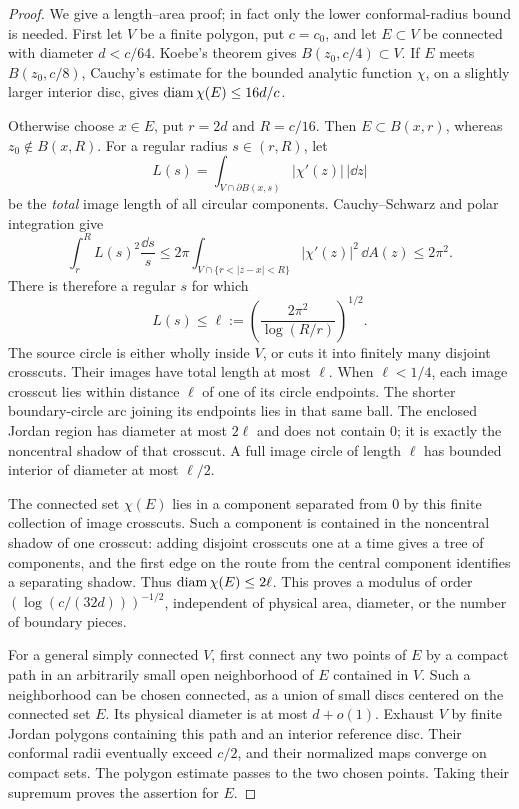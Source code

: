 \begin{proof}
We give a length--area proof; in fact only the lower conformal-radius
bound is needed. First let \(V\) be a finite polygon, put \(c=c_0\),
and let \(E\subset V\) be connected with diameter \(d<c/64\).
Koebe's theorem gives \(B(z_0,c/4)\subset V\).
If \(E\) meets \(B(z_0,c/8)\), Cauchy's estimate for the bounded
analytic function \(\chi\), on a slightly larger interior disc,
gives \(\operatorname{diam}\chi(E)\le16d/c\).

Otherwise choose \(x\in E\), put \(r=2d\) and \(R=c/16\).
Then \(E\subset B(x,r)\), whereas \(z_0\notin B(x,R)\).
For a regular radius \(s\in(r,R)\), let
\[
 L(s)=\int_{V\cap\partial B(x,s)}|\chi'(z)|\,|\dd z|
\]
be the \emph{total} image length of all circular components.
Cauchy--Schwarz and polar integration give
\[
 \int_r^R L(s)^2\frac{\dd s}{s}
 \le 2\pi\int_{V\cap\{r<|z-x|<R\}}|\chi'(z)|^2\,\dd A(z)
 \le2\pi^2.
\]
There is therefore a regular \(s\) for which
\[
 L(s)\le \ell:=
 \left(\frac{2\pi^2}{\log(R/r)}\right)^{1/2}.
\]
The source circle is either wholly inside \(V\), or cuts it into
finitely many disjoint crosscuts. Their images have total length
at most \(\ell\). When \(\ell<1/4\), each image crosscut lies within
distance \(\ell\) of one of its circle endpoints. The shorter
boundary-circle arc joining its endpoints lies in that same ball.
The enclosed Jordan region has diameter at most \(2\ell\) and
does not contain \(0\); it is exactly the noncentral shadow of
that crosscut. A full image circle of length \(\ell\) has bounded
interior of diameter at most \(\ell/2\).

The connected set \(\chi(E)\) lies in a component separated from
\(0\) by this finite collection of image crosscuts. Such a
component is contained in the noncentral shadow of one crosscut:
adding disjoint crosscuts one at a time gives a tree of
components, and the first edge on the route from the central
component identifies a separating shadow. Thus
\(\operatorname{diam}\chi(E)\le2\ell\).
This proves a modulus of order
\((\log(c/(32d)))^{-1/2}\), independent of physical area,
diameter, or the number of boundary pieces.

For a general simply connected \(V\), first connect any two
points of \(E\) by a compact path in an arbitrarily small open
neighborhood of \(E\) contained in \(V\). Such a neighborhood
can be chosen connected, as a union of small discs centered on
the connected set \(E\). Its physical diameter is at most
\(d+o(1)\). Exhaust \(V\) by finite Jordan polygons containing
this path and an interior reference disc. Their conformal radii
eventually exceed \(c/2\), and their normalized maps converge
on compact sets. The polygon estimate passes to the two chosen
points. Taking their supremum proves the assertion for \(E\).


\end{proof}

